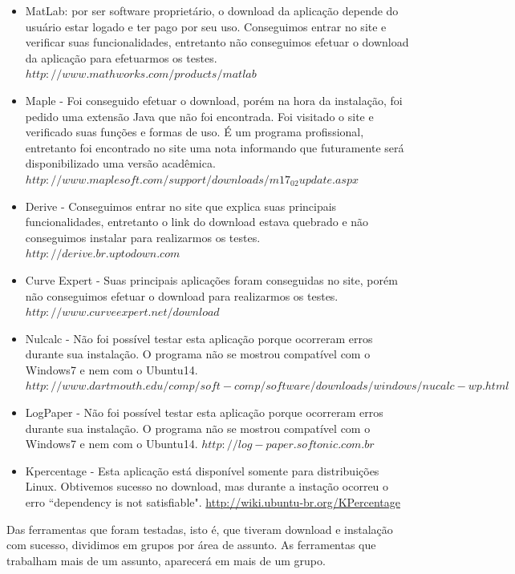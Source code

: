 \documentclass[12pt,a4paper]{article}
\begin{document}
\begin{itemize}
	\item MatLab: por ser software proprietário, o download da aplicação depende do usuário estar logado e ter pago por seu uso.  Conseguimos entrar no site e verificar suas funcionalidades, entretanto não conseguimos efetuar o download da aplicação para efetuarmos os testes. $http://www.mathworks.com/products/matlab$
	\item Maple - Foi conseguido efetuar o download, porém na hora da instalação, foi pedido uma extensão Java que não foi encontrada. Foi visitado o site e verificado suas funções e formas de uso. É um programa profissional, entretanto foi encontrado no site uma nota informando que futuramente será disponibilizado uma versão acadêmica. $http://www.maplesoft.com/support/downloads/m17_02update.aspx$
	\item Derive - Conseguimos entrar no site que explica suas principais funcionalidades, entretanto o link do download estava quebrado e não conseguimos instalar para realizarmos os testes. $http://derive.br.uptodown.com$
    \item Curve Expert - Suas principais aplicações foram conseguidas no site, porém não conseguimos efetuar o download para realizarmos os testes. $http://www.curveexpert.net/download$
	\item Nulcalc - Não foi possível testar esta aplicação porque ocorreram erros durante sua instalação. O programa não se mostrou compatível com o Windows7 e nem com o Ubuntu14. $http://www.dartmouth.edu/comp/soft-comp/software/downloads/windows/nucalc-wp.html$
	\item LogPaper - Não foi possível testar esta aplicação porque ocorreram erros durante sua instalação. O programa não se mostrou compatível com o Windows7 e nem com o Ubuntu14. $http://log-paper.softonic.com.br$
	 \item Kpercentage - Esta aplicação está disponível somente para distribuições Linux. Obtivemos sucesso no download, mas durante a instação ocorreu o erro ``dependency is not satisfiable". \url{http://wiki.ubuntu-br.org/KPercentage}
\end{itemize}
        
Das ferramentas que foram testadas, isto é, que tiveram download e instalação com sucesso, dividimos em grupos por área de assunto. As ferramentas que trabalham mais de um assunto, aparecerá em mais de um grupo.
\end{document}
